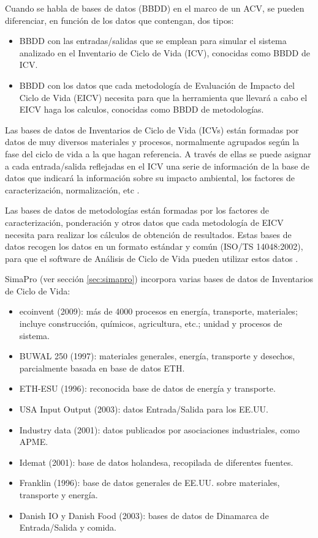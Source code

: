 Cuando se habla de bases de datos (BBDD) en el marco de un ACV, se pueden diferenciar, en función de los datos que contengan, dos tipos:
\begin{itemize}
  \item BBDD con las entradas/salidas que se emplean para simular el sistema analizado en el Inventario de Ciclo de Vida (ICV), conocidas como BBDD de ICV.
  \item BBDD con los datos que cada metodología de Evaluación de Impacto del Ciclo de Vida (EICV) necesita para que la herramienta que llevará a cabo el EICV haga los calculos, conocidas como BBDD de metodologías.
\end{itemize}

Las bases de datos de Inventarios de Ciclo de Vida (ICVs) están formadas por datos de muy diversos materiales y procesos, normalmente agrupados según la fase del ciclo de vida a la que hagan referencia. A través de ellas se puede asignar a cada entrada/salida reflejadas en el ICV una serie de información de la base de datos que indicará la información sobre su impacto ambiental, los factores de caracterización, normalización, etc \cite{ihobecarbono}.

Las bases de datos de metodologías están formadas por los factores de caracterización, ponderación y otros datos que cada metodología de EICV necesita para realizar los cálculos de obtención de resultados. Estas bases de datos recogen los datos en un formato estándar y común (ISO/TS 14048:2002), para que el software de Análisis de Ciclo de Vida pueden utilizar estos datos \cite{ihobecarbono}.

SimaPro (ver sección \ref{sec:simapro}) incorpora varias bases de datos de Inventarios de Ciclo de Vida:
\begin{itemize}
  \item ecoinvent (2009): más de 4000 procesos en energía, transporte, materiales; incluye construcción, químicos, agricultura, etc.; unidad y procesos de sistema.
  \item BUWAL 250 (1997): materiales generales, energía, transporte y desechos, parcialmente basada en base de datos ETH.
  \item ETH-ESU (1996): reconocida base de datos de energía y transporte.
  \item USA Input Output (2003): datos Entrada/Salida para los EE.UU.
  \item Industry data (2001): datos publicados por asociaciones industriales, como APME.
  \item Idemat (2001): base de datos holandesa, recopilada de diferentes fuentes.
  \item Franklin (1996): base de datos generales de EE.UU. sobre materiales, transporte y energía.
  \item Danish IO y Danish Food (2003): bases de datos de Dinamarca de Entrada/Salida y comida.
\end{itemize}

